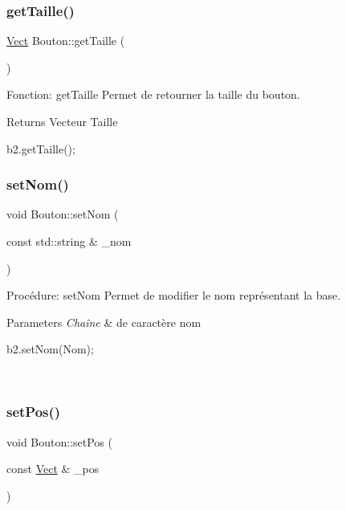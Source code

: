 \subsubsection{\texorpdfstring{get\+Taille()}{getTaille()}}
{\footnotesize\ttfamily \hyperlink{classVect}{Vect} Bouton\+::get\+Taille (\begin{DoxyParamCaption}{ }\end{DoxyParamCaption})}



Fonction\+: get\+Taille Permet de retourner la taille du bouton. 

\begin{DoxyReturn}{Returns}
Vecteur Taille 
\begin{DoxyCode}
b2.getTaille();
\end{DoxyCode}
 
\end{DoxyReturn}
\mbox{\label{classBouton_a4bdd74233fa0a3f6fe67d463b75d3f4a}} 
\subsubsection{\texorpdfstring{set\+Nom()}{setNom()}}
{\footnotesize\ttfamily void Bouton\+::set\+Nom (\begin{DoxyParamCaption}\item[{const std\+::string \&}]{\+\_\+nom }\end{DoxyParamCaption})}



Procédure\+: set\+Nom Permet de modifier le nom représentant la base. 


\begin{DoxyParams}{Parameters}
{\em Chaîne} & de caractère nom 
\begin{DoxyCode}
b2.setNom(Nom);
\end{DoxyCode}
 \\
\hline
\end{DoxyParams}
\mbox{\label{classBouton_a393e195ff7d1ff7a5d3c79edc922b0cd}} 
\subsubsection{\texorpdfstring{set\+Pos()}{setPos()}}
{\footnotesize\ttfamily void Bouton\+::set\+Pos (\begin{DoxyParamCaption}\item[{const \hyperlink{classVect}{Vect} \&}]{\+\_\+pos }\end{DoxyParamCaption})}



